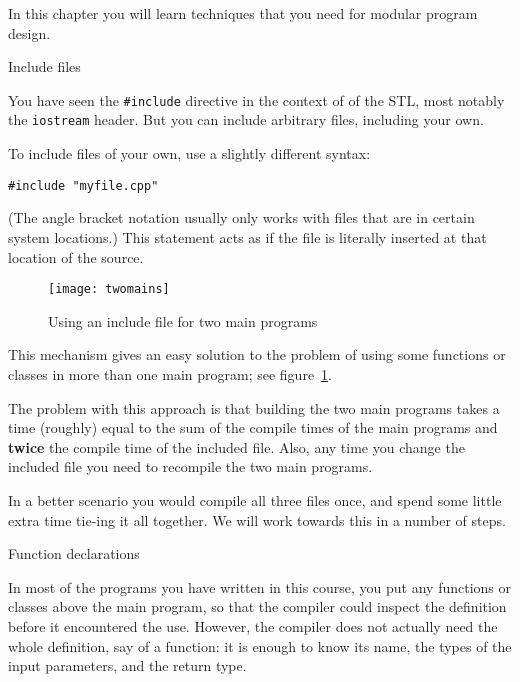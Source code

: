 
In this chapter you will learn techniques
that you need for modular program design.

 {Include files}

You have seen the \lstinline+#include+ directive
in the context of 
of the \ac{STL}, most notably the \lstinline{iostream} header.
But you can include arbitrary files, including your own.

To include files of your own, use a slightly different syntax:
\begin{lstlisting}
#include "myfile.cpp"
\end{lstlisting}
(The angle bracket notation usually only works
with files that are in certain system locations.)
This statement acts as if the file
is literally inserted at that location of the source.

\begin{figure}[ht]
  \texttt{[image: twomains]}
  \caption{Using an include file for two main programs}
  \label{fig:twomains}
\end{figure}
This mechanism gives an easy solution to the problem
of using some functions or classes in more than one main program;
see figure~\ref{fig:twomains}.

The problem with this approach is that building the two main programs
takes a time (roughly) equal to
the sum of the compile times of the main programs
and \textbf{twice} the compile time of the included file.
Also, any time you change the included file
you need to recompile the two main programs.

In a better scenario you would compile all three files once,
and spend some little extra time tie-ing it all together.
We will work towards this in a number of steps.

 {Function declarations}
\label{sec:proto}

In most of the programs you have written in this course, you put any
functions or classes above the main program, so that the compiler
could inspect the definition before it encountered the use. However,
the compiler does not actually need the whole definition, say of a
function: it is enough to know its name, the types of the input
parameters, and the return type.

